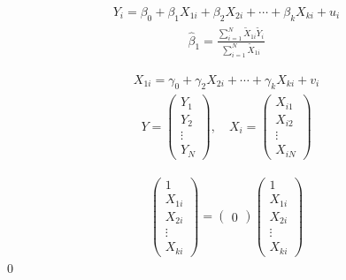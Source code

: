 \documentclass[uplatex,dvipdfmx,a4paper,11pt]{jlreq}
\makeatletter
\numberwithin{equation}{section}
\theoremstyle{definition}
\renewenvironment{proof}[1][\proofname]{\par
  \normalfont
  \topsep6\p@\@plus6\p@ \trivlist
  \item[\hskip\labelsep{\bfseries #1}\@addpunct{\bfseries}]\ignorespaces\quad\par
}{%
  \qed\endtrivlist\@endpefalse
}
\renewcommand\proofname{証明}
\makeatother
\begin{document}
\begin{theorem}
  \begin{align}
    Y_i = \beta_0 + \beta_1X_{1i} + \beta_2X_{2i} + \cdots + \beta_k X_{ki} + u_i
  \end{align}
  \begin{align}
    \hat{\beta}_1 = \frac{\sum_{i=1}^{N}\tilde{X}_{1i}\tilde{Y}_i}{\sum_{i=1}^{N}\tilde{X}_{1i}}
  \end{align}
\end{theorem}
\begin{proof}
  \begin{align}
    X_{1i} = \gamma_0 + \gamma_2X_{2i} + \cdots + \gamma_kX_{ki} + v_i
  \end{align}
  \begin{align}
    Y = \begin{pmatrix}
          Y_1 \\ Y_2 \\ \vdots \\ Y_N
        \end{pmatrix}, \quad
    X_i = \begin{pmatrix}
            X_{i1} \\ X_{i2} \\ \vdots \\ X_{iN}
          \end{pmatrix}
  \end{align}


  \begin{align}
    \begin{pmatrix}
      1 \\ X_{1i} \\ X_{2i} \\ \vdots \\ X_{ki}
    \end{pmatrix}
    =
    \begin{pmatrix}
      0
    \end{pmatrix}
    \begin{pmatrix}
      1 \\ X_{1i} \\ X_{2i} \\ \vdots \\ X_{ki}
    \end{pmatrix}
  \end{align}
\end{proof}
\end{document}
